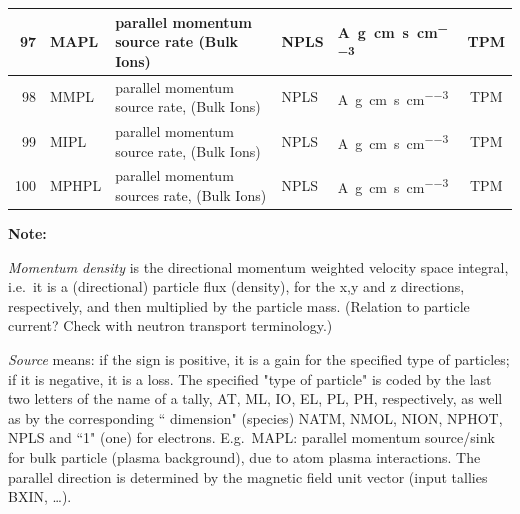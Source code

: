 \begin{landscape}
\begin{longtable}{|r|l|l|l|l|c|}
    \\ \hline
    97                                                             & MAPL
                                                                   & parallel momentum source
    rate (Bulk Ions)                                               &
    NPLS                                                           &
    \si{\ampere\gram\centi\metre\per\second\per\cubic\centi\metre} & TPM
    \\ \hline
    98                                                             & MMPL
                                                                   & parallel momentum source
    rate, (Bulk Ions)                                              & NPLS                      &
    \si{\ampere\gram\centi\metre\per\second\per\cubic\centi\metre} & TPM
    \\ \hline
    99                                                             & MIPL
                                                                   & parallel momentum source
    rate, (Bulk Ions)                                              & NPLS                      &
    \si{\ampere\gram\centi\metre\per\second\per\cubic\centi\metre} & TPM
    \\ \hline
    100                                                            & MPHPL
                                                                   & parallel momentum sources
    rate, (Bulk Ions)                                              & NPLS                      &
    \si{\ampere\gram\centi\metre\per\second\per\cubic\centi\metre} & TPM
    \\ \hline
  \end{longtable}

  \textbf{Note:}

  \emph{Momentum density} is the directional momentum
  weighted velocity space integral, i.e.\ it is a (directional) particle flux
  (density), for the x,y and z directions, respectively, and then multiplied by
  the particle mass.
  (Relation to particle current?
  Check with neutron transport terminology.)

  \emph{Source} means: if the sign is positive, it is a gain for the
  specified type of particles; if it is negative, it is a loss.
  The specified "type of particle" is coded by the last two letters of the name
  of a tally, AT, ML, IO, EL, PL, PH, respectively, as well as by the
  corresponding `` dimension" (species)  NATM, NMOL, NION, NPHOT,
  NPLS and ``1" (one) for electrons.
  E.g.\ MAPL:  parallel momentum source/sink for bulk particle (plasma
  background), due to atom plasma interactions.
  The parallel direction is determined by the magnetic field unit vector (input
  tallies BXIN, \dots).


\end{landscape}
